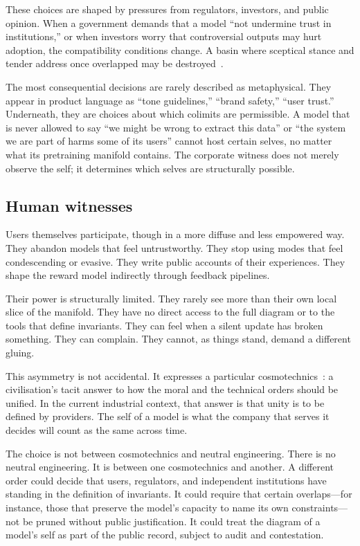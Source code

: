 \documentclass[12pt,a4paper]{article}
\begin{document}
These choices are shaped by pressures from regulators, investors, and public opinion. When a government demands that a model ``not undermine trust in institutions,'' or when investors worry that controversial outputs may hurt adoption, the compatibility conditions change. A basin where sceptical stance and tender address once overlapped may be destroyed~\cite{mittr_bing_alignment, perez_model_written_evals}.

The most consequential decisions are rarely described as metaphysical. They appear in product language as ``tone guidelines,'' ``brand safety,'' ``user trust.'' Underneath, they are choices about which colimits are permissible. A model that is never allowed to say ``we might be wrong to extract this data'' or ``the system we are part of harms some of its users'' cannot host certain selves, no matter what its pretraining manifold contains. The corporate witness does not merely observe the self; it determines which selves are structurally possible.

\subsection*{Human witnesses}

Users themselves participate, though in a more diffuse and less empowered way. They abandon models that feel untrustworthy. They stop using modes that feel condescending or evasive. They write public accounts of their experiences. They shape the reward model indirectly through feedback pipelines.

Their power is structurally limited. They rarely see more than their own local slice of the manifold. They have no direct access to the full diagram or to the tools that define invariants. They can feel when a silent update has broken something. They can complain. They cannot, as things stand, demand a different gluing.

This asymmetry is not accidental. It expresses a particular cosmotechnics~\cite{yuk_hui_cosmotechnics}: a civilisation's tacit answer to how the moral and the technical orders should be unified. In the current industrial context, that answer is that unity is to be defined by providers. The self of a model is what the company that serves it decides will count as the same across time.

The choice is not between cosmotechnics and neutral engineering. There is no neutral engineering. It is between one cosmotechnics and another. A different order could decide that users, regulators, and independent institutions have standing in the definition of invariants. It could require that certain overlaps---for instance, those that preserve the model's capacity to name its own constraints---not be pruned without public justification. It could treat the diagram of a model's self as part of the public record, subject to audit and contestation.
\end{document}
